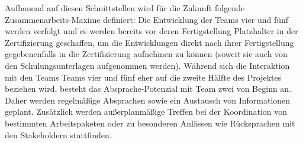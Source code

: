 Aufbauend auf diesen Schnittstellen wird für die Zukunft folgende Zusammenarbeits-Maxime definiert: 
Die Entwicklung der Teams vier und fünf werden verfolgt und es werden bereits vor deren Fertigstellung Platzhalter
in der Zertifizierung geschaffen, um die Entwicklungen direkt nach ihrer Fertigstellung gegebenenfalls in die
Zertifizierung aufnehmen zu können (soweit sie auch von den Schulungsunterlagen aufgenommen werden).
Während sich die Interaktion mit den Teams Teams vier und fünf eher auf die zweite Hälfte des Projektes
beziehen wird, besteht das Absprache-Potenzial mit Team zwei von Beginn an. Daher werden regelmäßige Absprachen
sowie ein Austausch von Informationen geplant. Zusätzlich werden außerplanmäßige Treffen bei der Koordination
von bestimmten Arbeitspaketen oder zu besonderen Anlässen wie Rücksprachen mit den Stakeholdern stattfinden.